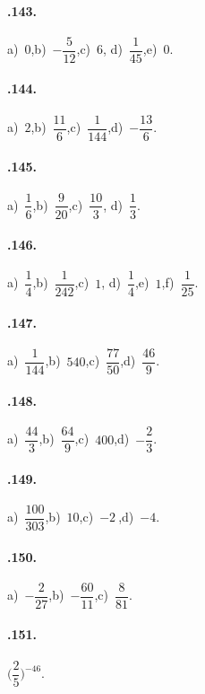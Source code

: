 \begin{multicols}{2}
\paragraph{\thechapter.143.}
a)~$0$,\quad b)~$-\dfrac{5}{12}$,\quad c)~$6$,\quad %
d)~$\dfrac{1}{45}$,\quad e)~$0$.

\paragraph{\thechapter.144.}
a)~$2$,\quad b)~$\dfrac{11}{6}$,\quad c)~$\dfrac{1}{144}$,\quad d)~$-\dfrac{13}{6}$.

\paragraph{\thechapter.145.}
a)~$\dfrac{1}{6}$,\quad b)~$\dfrac{9}{20}$,\quad c)~$\dfrac{10}{3}$,\quad %
d)~$\dfrac{1}{3}$.

\paragraph{\thechapter.146.}
a)~$\dfrac{1}{4}$,\quad b)~$\dfrac{1}{242}$,\quad c)~$1$,\quad %
d)~$\dfrac{1}{4}$,\quad e)~$1$,\quad f)~$\dfrac{1}{25}$.

\paragraph{\thechapter.147.}
a)~$\dfrac{1}{144}$,\quad b)~$540$,\quad c)~$\dfrac{77}{50}$,\quad d)~$\dfrac{46}{9}$.

\paragraph{\thechapter.148.}
a)~$\dfrac{44}{3}$,\quad b)~$\dfrac{64}{9}$,\quad c)~$400$,\quad d)~$-\dfrac{2}{3}$.

\paragraph{\thechapter.149.}
a)~$\dfrac{100}{303}$,\quad b)~$10$,\quad c)~$-2~$,\quad d)~$-4$.

\paragraph{\thechapter.150.}
a)~$-\dfrac{2}{27}$,\quad b)~$-\dfrac{60}{11}$,\quad c)~$\dfrac{8}{81}$.%

\paragraph{\thechapter.151.}
$\bigg(\dfrac{2}{5}\bigg)^{-46}$.


\end{multicols}
